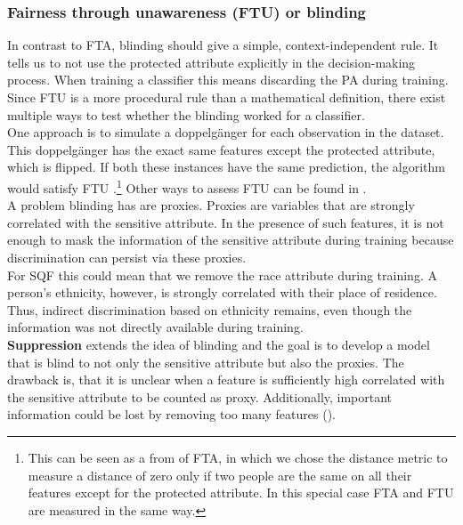 \subsubsection*{Fairness through unawareness (FTU) or blinding}
In contrast to FTA, blinding should give a simple, context-independent rule. It tells us to not use the protected attribute explicitly in the decision-making process. When training a classifier this means discarding the PA during training.
Since FTU is a more procedural rule than a mathematical definition, there exist multiple ways to test whether the blinding worked for a classifier. \\
One approach is to simulate a doppelgänger for each observation in the dataset. This doppelgänger has the exact same features except the protected attribute, which is flipped.
If both these instances have the same prediction, the algorithm would satisfy FTU \cite{verma2018}.\footnote{This can be seen as a from of FTA, in which we chose the distance metric to measure a distance of zero only if two people are the same on all their features except for the protected attribute. In this special case FTA and FTU are measured in the same way.} Other ways to assess FTU can be found in \cite{verma2018}.\\
A problem blinding has are proxies. Proxies are variables that are strongly correlated with the sensitive attribute. In the presence of such features, it is not enough to mask the information of the sensitive attribute during training because discrimination can persist via these proxies.\\
For SQF this could mean that we remove the race attribute during training.
A person's ethnicity, however, is strongly correlated with their place of residence. Thus, indirect discrimination based on ethnicity remains, even though the information was not directly available during training.\\
\textbf{Suppression} extends the idea of blinding and the goal is to develop a model that is blind to not only the sensitive attribute but also the proxies. The drawback is, that it is unclear when a feature is sufficiently high correlated with the sensitive attribute to be counted as proxy. Additionally, important information could be lost by removing too many features (\cite{castelnovo2022}).


